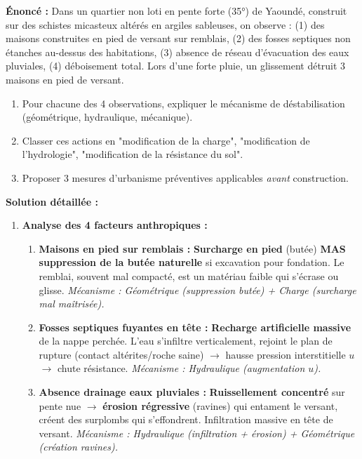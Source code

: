 \documentclass[11pt]{article}
\begin{document}
\begin{exoresolu}
    \textbf{Énoncé :} Dans un quartier non loti en pente forte (35°) de Yaoundé, construit sur des schistes micasteux altérés en argiles sableuses, on observe : (1) des maisons construites en pied de versant sur remblais, (2) des fosses septiques non étanches au-dessus des habitations, (3) absence de réseau d'évacuation des eaux pluviales, (4) déboisement total. Lors d'une forte pluie, un glissement détruit 3 maisons en pied de versant.
    \begin{enumerate}
        \item Pour chacune des 4 observations, expliquer le mécanisme de déstabilisation (géométrique, hydraulique, mécanique).
        \item Classer ces actions en "modification de la charge", "modification de l'hydrologie", "modification de la résistance du sol".
        \item Proposer 3 mesures d'urbanisme préventives applicables \emph{avant} construction.
    \end{enumerate}
    \tcblower
    \textbf{Solution détaillée :}
    \begin{enumerate}
        \item \textbf{Analyse des 4 facteurs anthropiques :}
            \begin{enumerate}
                \item \textbf{Maisons en pied sur remblais :} \textbf{Surcharge en pied} (butée) \textbf{MAS} \textbf{suppression de la butée naturelle} si excavation pour fondation. Le remblai, souvent mal compacté, est un matériau faible qui s'écrase ou glisse. \textit{Mécanisme : Géométrique (suppression butée) + Charge (surcharge mal maîtrisée).}
                \item \textbf{Fosses septiques fuyantes en tête :} \textbf{Recharge artificielle massive} de la nappe perchée. L'eau s'infiltre verticalement, rejoint le plan de rupture (contact altérites/roche saine) $\rightarrow$ hausse pression interstitielle $u$ $\rightarrow$ chute résistance. \textit{Mécanisme : Hydraulique (augmentation $u$).}
                \item \textbf{Absence drainage eaux pluviales :} \textbf{Ruissellement concentré} sur pente nue $\rightarrow$ \textbf{érosion régressive} (ravines) qui entament le versant, créent des surplombs qui s'effondrent. Infiltration massive en tête de versant. \textit{Mécanisme : Hydraulique (infiltration + érosion) + Géométrique (création ravines).}

\end{enumerate}
\end{enumerate}
\end{exoresolu}
\end{document}
